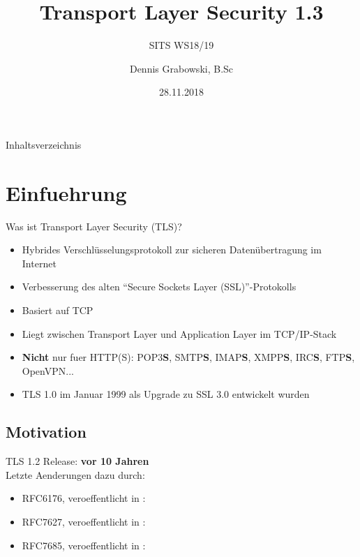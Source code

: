 \documentclass{f4_beamer_metropolis}
\title{Transport Layer Security 1.3}
\subtitle{SITS WS18/19}
\author{Dennis Grabowski, B.Sc}
\date{28.11.2018}
\begin{document}
\begin{frame}{Inhaltsverzeichnis}
    \tableofcontents[hideallsubsections]
  \end{frame}

\section{Einfuehrung}

\begin{frame}{Was ist Transport Layer Security (TLS)?}
  \begin{itemize}
    \item Hybrides Verschlüsselungsprotokoll zur sicheren Datenübertragung im Internet
    \item Verbesserung des alten \enquote{Secure Sockets Layer (SSL)}-Protokolls
    \item Basiert auf TCP
    \item Liegt zwischen Transport Layer und Application Layer im TCP/IP-Stack
    \item \textbf{Nicht} nur fuer HTTP(S): POP3\textbf{S}, SMTP\textbf{S}, IMAP\textbf{S}, XMPP\textbf{S}, IRC\textbf{S}, FTP\textbf{S}, OpenVPN...
    \item TLS 1.0 im Januar 1999 als Upgrade zu SSL 3.0 entwickelt wurden
  \end{itemize}

\end{frame}

\subsection{Motivation}

\begin{frame}{TLS 1.2}
Release: \textbf{vor 10 Jahren} \\
Letzte Aenderungen dazu durch:
\begin{itemize}
    \item RFC6176, veroeffentlicht in \textbf{\citeyear{RFC6176}}: \newline
    \textit{}
    \item RFC7627, veroeffentlicht in \textbf{\citeyear{RFC7627}}: \newline
    \textit{}
    \item RFC7685, veroeffentlicht in \textbf{\citeyear{RFC7685}}: \newline
    \textit{}
\end{itemize}
\end{frame}
\end{document}
